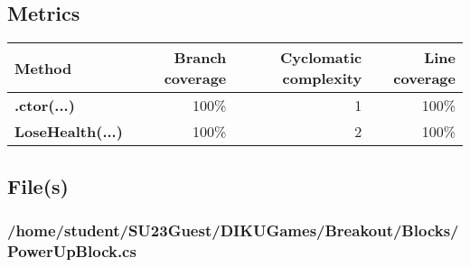 \documentclass[a4paper,landscape,10pt]{article}
\begin{document}
\subsection{Metrics}
\begin{longtable}[l]{|l|r|r|r|}
\hline
\textbf{Method} & \textbf{Branch coverage} & \textbf{Cyclomatic complexity} & \textbf{Line coverage}\\
\hline
\textbf{.ctor(...)} & 100\% & 1 & 100\%\\
\hline
\textbf{LoseHealth(...)} & 100\% & 2 & 100\%\\
\hline
\end{longtable}
\subsection{File(s)}
\subsubsection{/home/student/SU23Guest/DIKUGames/Breakout/Blocks/PowerUpBlock.cs}
\end{document}
